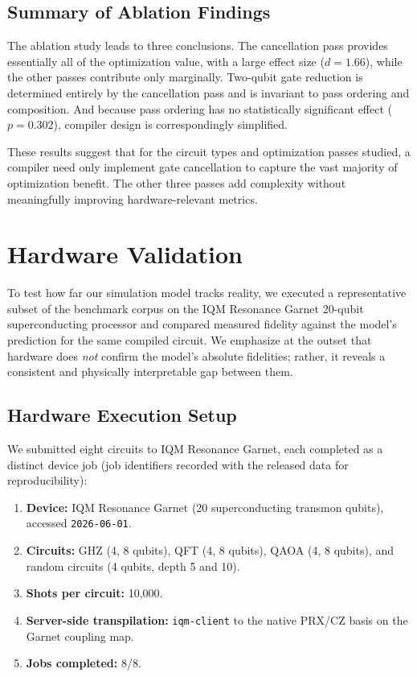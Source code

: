 \documentclass[sigconf,nonacm]{acmart}
\begin{document}
\subsection{Summary of Ablation Findings}

The ablation study leads to three conclusions. The cancellation pass provides essentially all of the optimization value, with a large effect size ($d = 1.66$), while the other passes contribute only marginally. Two-qubit gate reduction is determined entirely by the cancellation pass and is invariant to pass ordering and composition. And because pass ordering has no statistically significant effect ($p = 0.302$), compiler design is correspondingly simplified.

These results suggest that for the circuit types and optimization passes studied, a compiler need only implement gate cancellation to capture the vast majority of optimization benefit. The other three passes add complexity without meaningfully improving hardware-relevant metrics.

\section{Hardware Validation}
\label{sec:hardware}

To test how far our simulation model tracks reality, we executed a representative subset of the benchmark corpus on the IQM Resonance Garnet 20-qubit superconducting processor and compared measured fidelity against the model's prediction for the same compiled circuit. We emphasize at the outset that hardware does \emph{not} confirm the model's absolute fidelities; rather, it reveals a consistent and physically interpretable gap between them.

\subsection{Hardware Execution Setup}

We submitted eight circuits to IQM Resonance Garnet, each completed as a distinct device job (job identifiers recorded with the released data for reproducibility):
\begin{enumerate}
    \item \textbf{Device:} IQM Resonance Garnet (20 superconducting transmon qubits), accessed \texttt{2026-06-01}.
    \item \textbf{Circuits:} GHZ (4, 8 qubits), QFT (4, 8 qubits), QAOA (4, 8 qubits), and random circuits (4 qubits, depth 5 and 10).
    \item \textbf{Shots per circuit:} 10{,}000.
    \item \textbf{Server-side transpilation:} \texttt{iqm-client} to the native PRX/CZ basis on the Garnet coupling map.
    \item \textbf{Jobs completed:} 8/8.
\end{enumerate}
\end{document}
